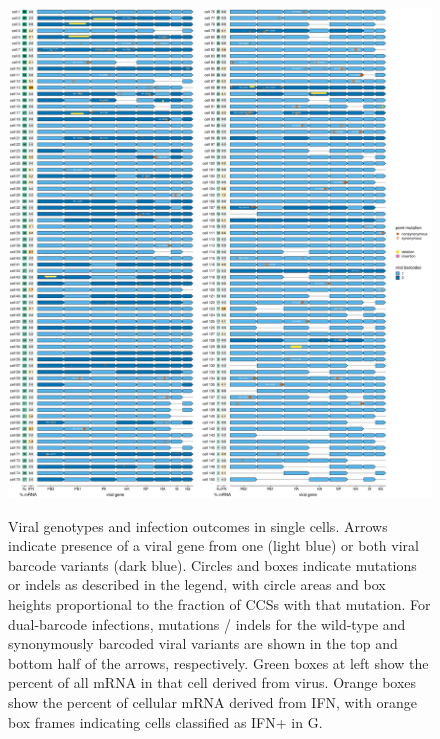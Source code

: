 \documentclass[9pt,lineno]{elife}
\begin{document}
\begin{figure}
\begin{fullwidth}
{\centering
\includegraphics[height=0.78\textheight]{figures/single_cell_figures/p_genotypes.pdf}
}
\caption{
Viral genotypes and infection outcomes in single cells.
Arrows indicate presence of a viral gene from one (light blue) or both viral barcode variants (dark blue).
Circles and boxes indicate mutations or indels as described in the legend, with circle areas and box heights proportional to the fraction of CCSs with that mutation.
For dual-barcode infections, mutations / indels for the wild-type and synonymously barcoded viral variants are shown in the top and bottom half of the arrows, respectively. 
Green boxes at left show the percent of all mRNA in that cell derived from virus.
Orange boxes show the percent of cellular mRNA derived from IFN, with orange box frames indicating cells classified as IFN+ in G.
}
\label{fig:genotypes}


\end{fullwidth}
\end{figure}
\end{document}
